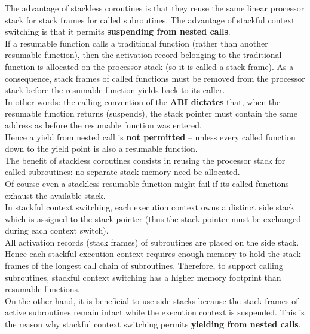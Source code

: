 The advantage of stackless coroutines is that they reuse the same linear
processor stack for stack frames for called subroutines. The advantage of
stackful context switching is that it permits {\bfseries suspending from
nested calls}.\\
\newline
If a resumable function calls a traditional function (rather than another
resumable function), then the activation record belonging to the traditional
function is allocated on the processor stack (so it is called a stack frame).
As a consequence, stack frames of called functions must be removed from the
processor stack before the resumable function yields back to its caller.\\
In other words: the calling convention of the {\bfseries ABI dictates} that,
when the resumable function returns (suspends), the stack pointer must contain
the same address as before the resumable function was entered.\\
Hence a yield from nested call is {\bfseries not permitted} -- unless every
called function down to the yield point is also a resumable function.\\
The benefit of stackless coroutines consists in reusing the processor stack
for called subroutines: no separate stack memory need be allocated.\\
\newline
Of course even a stackless resumable function might fail if its called
functions exhaust the available stack.\\
\newline
In stackful context switching, each execution context owns a
distinct side stack which is assigned to the stack pointer (thus the stack
pointer must be exchanged during each context switch).\\
All activation records (stack frames) of subroutines are placed on the side
stack. Hence each stackful execution context requires enough memory to hold
the stack frames of the longest call chain of subroutines. Therefore, to
support calling subroutines, stackful context switching has a higher memory
footprint than resumable functions.\\
On the other hand, it is beneficial to use side stacks because the stack
frames of active subroutines remain intact while the execution context is
suspended. This is the reason why stackful context switching permits
{\bfseries yielding from nested calls}.


